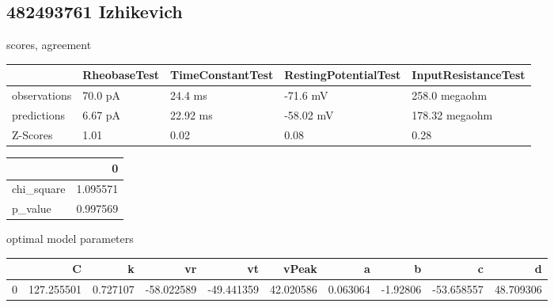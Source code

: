 \subsection{482493761 Izhikevich} scores, agreement\begin{tabular}{lllll}
\toprule
{} & RheobaseTest & TimeConstantTest & RestingPotentialTest & InputResistanceTest \\
\midrule
observations &      70.0 pA &          24.4 ms &             -71.6 mV &       258.0 megaohm \\
predictions  &      6.67 pA &         22.92 ms &            -58.02 mV &      178.32 megaohm \\
Z-Scores     &         1.01 &             0.02 &                 0.08 &                0.28 \\
\bottomrule
\end{tabular}
\begin{tabular}{lr}
\toprule
{} &         0 \\
\midrule
chi\_square &  1.095571 \\
p\_value    &  0.997569 \\
\bottomrule
\end{tabular}
optimal model parameters\begin{tabular}{lrrrrrrrrr}
\toprule
{} &           C &         k &         vr &         vt &      vPeak &         a &        b &          c &          d \\
\midrule
0 &  127.255501 &  0.727107 & -58.022589 & -49.441359 &  42.020586 &  0.063064 & -1.92806 & -53.658557 &  48.709306 \\
\bottomrule
\end{tabular}
